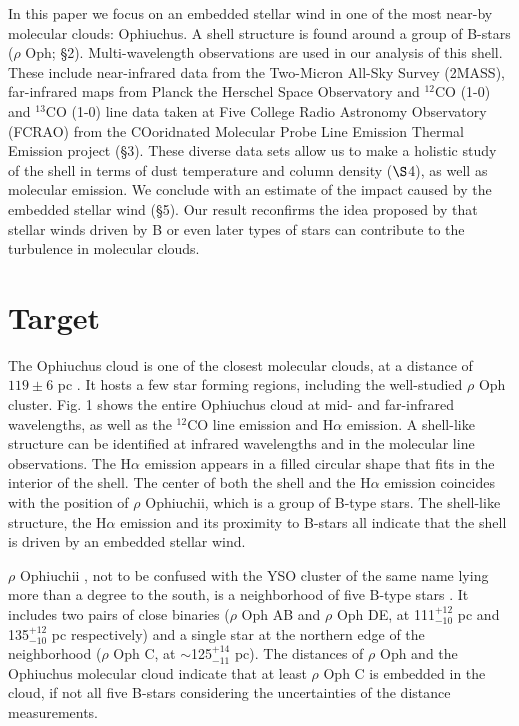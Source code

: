 \documentclass[11pt,a4paper]{emulateapj}
\begin{document}
In this paper we focus on an embedded stellar wind in one of the most near-by molecular clouds: Ophiuchus. A shell structure is found around a group of B-stars ($\rho$ Oph; \S2). Multi-wavelength observations are used in our analysis of this shell. These include near-infrared data from the Two-Micron All-Sky Survey (2MASS), far-infrared maps from Planck the Herschel Space Observatory and $^{12}$CO (1-0) and $^{13}$CO (1-0) line data taken at Five College Radio Astronomy Observatory (FCRAO) from the COoridnated Molecular Probe Line Emission Thermal Emission \citep[COMPLETE;]{Ridge_2006} project (\S3). These diverse data sets allow us to make a holistic study of the shell in terms of dust temperature and column density ($\S$4), as well as molecular emission. We conclude with an estimate of the impact caused by the embedded stellar wind (\S5). Our result reconfirms the idea proposed by \citet{Arce_2011} that stellar winds driven by B or even later types of stars can contribute to the turbulence in molecular clouds.

\section{Target}
The Ophiuchus cloud is one of the closest molecular clouds, at a distance of $119 \pm 6$ pc \citep{Lombardi_2008}. It hosts a few star forming regions, including the well-studied $\rho$ Oph cluster. Fig. 1 shows the entire Ophiuchus cloud at mid- and far-infrared wavelengths, as well as the $^{12}$CO line emission and H$\alpha$ emission. A shell-like structure can be identified at infrared wavelengths and in the molecular line observations. The H$\alpha$ emission appears in a filled circular shape that fits in the interior of the shell. The center of both the shell and the H$\alpha$ emission coincides with the position of $\rho$ Ophiuchii, which is a group of B-type stars. The shell-like structure, the H$\alpha$ emission and its proximity to B-stars all indicate that the shell is driven by an embedded stellar wind. 

$\rho$ Ophiuchii \citep[16h 25m 35.12s, -23d 26m 49.82s, J2000,]{van_Leeuwen_2007}, not to be confused with the YSO cluster of the same name lying more than a degree to the south, is a neighborhood of five B-type stars \citep{Cordiner_2013}. It includes two pairs of close binaries ($\rho$ Oph AB and $\rho$ Oph DE, at 111$^{+12}_{-10}$ pc and 135$^{+12}_{-10}$ pc respectively) and a single star at the northern edge of the neighborhood ($\rho$ Oph C, at $\sim$125$^{+14}_{-11}$ pc). The distances of $\rho$ Oph and the Ophiuchus molecular cloud indicate that at least $\rho$ Oph C is embedded in the cloud, if not all five B-stars considering the uncertainties of the distance measurements.
\end{document}
